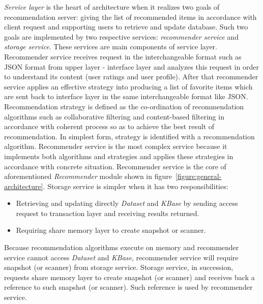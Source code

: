 \documentclass[a4paper,twoside]{article}
\begin{document}
\textit{Service layer} is the heart of architecture when it realizes two goals of recommendation server: giving the list of recommended items in accordance with client request and supporting users to retrieve and update database. Such two goals are implemented by two respective services: \textit{recommender service} and \textit{storage service}. These services are main components of service layer. Recommender service receives request in the interchangeable format such as JSON format from upper layer - interface layer and analyzes this request in order to understand its content (user ratings and user profile). After that recommender service applies an effective strategy into producing a list of favorite items which are sent back to interface layer in the same interchangeable format like JSON. Recommendation strategy is defined as the co-ordination of recommendation algorithms such as collaborative filtering and content-based filtering in accordance with coherent process so as to achieve the best result of recommendation. In simplest form, strategy is identified with a recommendation algorithm. Recommender service is the most complex service because it implements both algorithms and strategies and applies these strategies in accordance with concrete situation. Recommender service is the core of aforementioned \textit{Recommender} module shown in figure~\ref{figure:general-architecture}. Storage service is simpler when it has two responsibilities:
\begin{itemize}
\item Retrieving and updating directly \textit{Dataset} and \textit{KBase} by sending access request to transaction layer and receiving results returned.
\item Requiring share memory layer to create snapshot or scanner.
\end{itemize}
Because recommendation algorithms execute on memory and recommender service cannot access \textit{Dataset} and \textit{KBase}, recommender service will require snapshot (or scanner) from storage service. Storage service, in succession, requests share memory layer to create snapshot (or scanner) and receives back a reference to such snapshot (or scanner). Such reference is used by recommender service.
\end{document}
